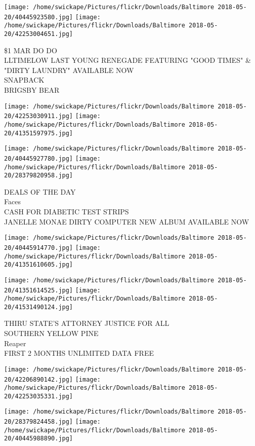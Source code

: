 \documentclass[10pt,letterpaper]{article}
\begin{document}
\texttt{[image: /home/swickape/Pictures/flickr/Downloads/Baltimore 2018-05-20/40445923580.jpg]}
\texttt{[image: /home/swickape/Pictures/flickr/Downloads/Baltimore 2018-05-20/42253004651.jpg]}

\$1 MAR DO DO\\
LLTIMELOW LAST YOUNG RENEGADE FEATURING "GOOD TIMES" \& "DIRTY LAUNDRY" AVAILABLE NOW\\
SNAPBACK\\
BRIGSBY BEAR\\
\pagebreak

\texttt{[image: /home/swickape/Pictures/flickr/Downloads/Baltimore 2018-05-20/42253030911.jpg]}
\texttt{[image: /home/swickape/Pictures/flickr/Downloads/Baltimore 2018-05-20/41351597975.jpg]}

\texttt{[image: /home/swickape/Pictures/flickr/Downloads/Baltimore 2018-05-20/40445927780.jpg]}
\texttt{[image: /home/swickape/Pictures/flickr/Downloads/Baltimore 2018-05-20/28379820958.jpg]}

DEALS OF THE DAY\\
Faces\\
CASH FOR DIABETIC TEST STRIPS\\
JANELLE MONAE DIRTY COMPUTER NEW ALBUM AVAILABLE NOW\\
\pagebreak

\texttt{[image: /home/swickape/Pictures/flickr/Downloads/Baltimore 2018-05-20/40445914770.jpg]}
\texttt{[image: /home/swickape/Pictures/flickr/Downloads/Baltimore 2018-05-20/41351610605.jpg]}

\texttt{[image: /home/swickape/Pictures/flickr/Downloads/Baltimore 2018-05-20/41351614525.jpg]}
\texttt{[image: /home/swickape/Pictures/flickr/Downloads/Baltimore 2018-05-20/41531490124.jpg]}

THIRU STATE'S ATTORNEY JUSTICE FOR ALL\\
SOUTHERN YELLOW PINE\\
Reaper\\
FIRST 2 MONTHS UNLIMITED DATA FREE\\
\pagebreak

\texttt{[image: /home/swickape/Pictures/flickr/Downloads/Baltimore 2018-05-20/42206890142.jpg]}
\texttt{[image: /home/swickape/Pictures/flickr/Downloads/Baltimore 2018-05-20/42253035331.jpg]}

\texttt{[image: /home/swickape/Pictures/flickr/Downloads/Baltimore 2018-05-20/28379824458.jpg]}
\texttt{[image: /home/swickape/Pictures/flickr/Downloads/Baltimore 2018-05-20/40445988890.jpg]}
\end{document}

